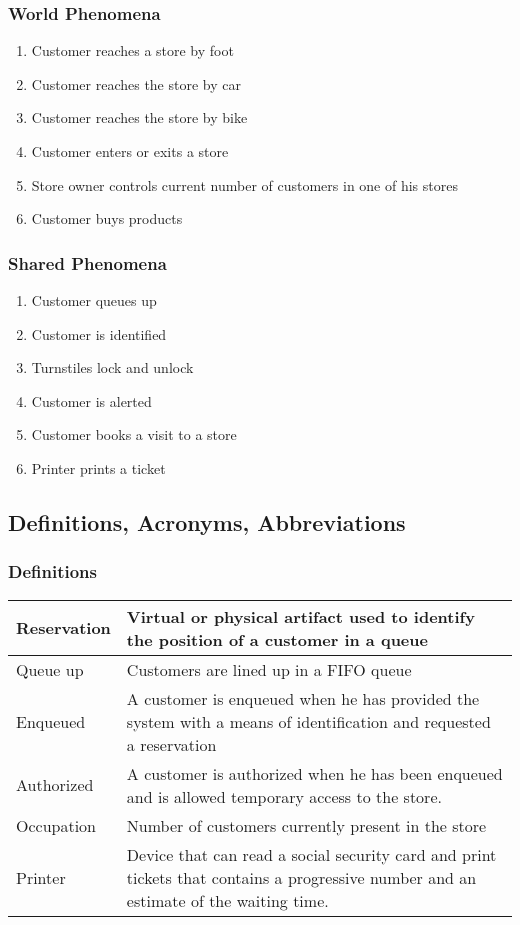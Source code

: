 \subsubsection{World Phenomena}
\begin{enumerate}[label=WP\arabic*]
	\item Customer reaches a store by foot
	\item Customer reaches the store by car
	\item Customer reaches the store by bike
	\item Customer enters or exits a store
	\item Store owner controls current number of customers in one of his stores
	\item Customer buys products
\end{enumerate}
\subsubsection{Shared Phenomena}
\begin{enumerate}[label=SP\arabic*]
	\item Customer queues up
	\item Customer is identified %
	\item Turnstiles lock and unlock
	\item Customer is alerted %
	\item Customer books a visit to a store
	\item Printer prints a ticket
\end{enumerate}
\subsection{Definitions, Acronyms, Abbreviations}
\subsubsection{Definitions}
\begin{tabular}{ | m{5cm} | m{10cm} | }
	\hline
	Reservation & Virtual or physical artifact used to identify the position of a customer in a queue \\
	\hline
	Queue up & Customers are lined up in a FIFO queue\\
	\hline
	Enqueued & A customer is enqueued when he has provided the system with a means of identification and requested a reservation\\
	\hline
	Authorized & A customer is authorized when he has been enqueued and is allowed temporary access to the store.\\
	\hline
	Occupation & Number of customers currently present in the store\\
	\hline
	Printer & Device that can read a social security card and print tickets that contains a progressive number and an estimate of the waiting time.\\
	\hline
\end{tabular}

